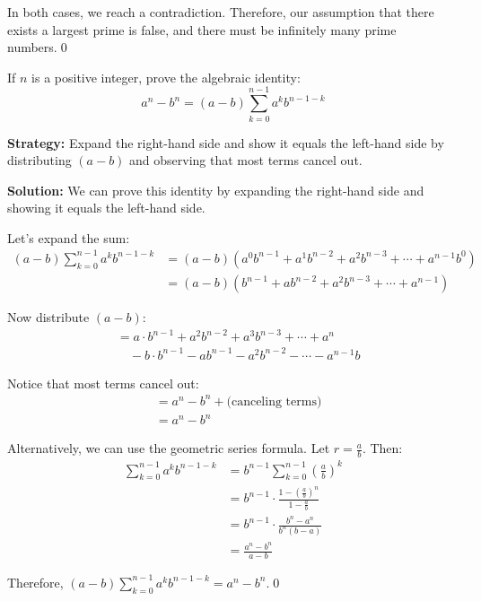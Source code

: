 In both cases, we reach a contradiction. Therefore, our assumption that there exists a largest prime is false, and there must be infinitely many prime numbers.\qed



\begin{problembox}
If $n$ is a positive integer, prove the algebraic identity:
\[
a^n - b^n = (a - b)\sum_{k=0}^{n-1} a^k b^{n-1-k}
\]
\end{problembox}

\noindent\textbf{Strategy:} Expand the right-hand side and show it equals the left-hand side by distributing $(a-b)$ and observing that most terms cancel out.

\bigskip\noindent\textbf{Solution:}
We can prove this identity by expanding the right-hand side and showing it equals the left-hand side.

Let's expand the sum:
\begin{align*}
(a - b)\sum_{k=0}^{n-1} a^k b^{n-1-k} &= (a - b)(a^0 b^{n-1} + a^1 b^{n-2} + a^2 b^{n-3} + \cdots + a^{n-1} b^0) \\
&= (a - b)(b^{n-1} + a b^{n-2} + a^2 b^{n-3} + \cdots + a^{n-1})
\end{align*}

Now distribute $(a - b)$:
\begin{align*}
&= a \cdot b^{n-1} + a^2 b^{n-2} + a^3 b^{n-3} + \cdots + a^n \\
&\quad - b \cdot b^{n-1} - a b^{n-1} - a^2 b^{n-2} - \cdots - a^{n-1} b
\end{align*}

Notice that most terms cancel out:
\begin{align*}
&= a^n - b^n + \text{(canceling terms)} \\
&= a^n - b^n
\end{align*}

Alternatively, we can use the geometric series formula. Let $r = \frac{a}{b}$. Then:
\begin{align*}
\sum_{k=0}^{n-1} a^k b^{n-1-k} &= b^{n-1} \sum_{k=0}^{n-1} \left(\frac{a}{b}\right)^k \\
&= b^{n-1} \cdot \frac{1 - \left(\frac{a}{b}\right)^n}{1 - \frac{a}{b}} \\
&= b^{n-1} \cdot \frac{b^n - a^n}{b^n(b - a)} \\
&= \frac{a^n - b^n}{a - b}
\end{align*}

Therefore, $(a - b)\sum_{k=0}^{n-1} a^k b^{n-1-k} = a^n - b^n$.\qed



